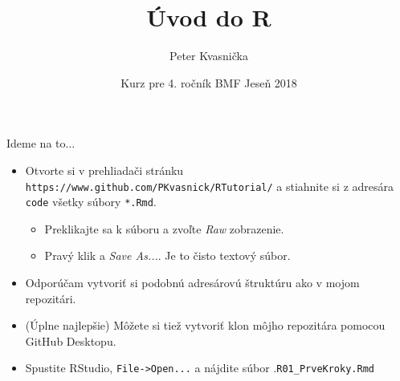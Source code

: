 \documentclass[9pt]{beamer}
\author{Peter Kvasnička}
\title{Úvod do R}
\institute{Univerzita Karlova, Praha}
\date{Kurz pre 4. ročník BMF \newline Jeseň 2018}
\begin{document}
\begin{frame}
\titlepage
\end{frame}

\clearpage  \clearpage
\clearpage  \clearpage

\begin{frame}{Ideme na to...}
	\begin{itemize}
		\item Otvorte si v prehliadači stránku \texttt{https://www.github.com/PKvasnick/RTutorial/} a stiahnite si z adresára \texttt{code} všetky súbory \texttt{*.Rmd}.
		\begin{itemize}
			\item Preklikajte sa k súboru a zvoľte \emph{Raw} zobrazenie.
			\item Pravý klik a \emph{Save As...}. Je to čisto textový súbor.
		\end{itemize}
		\item Odporúčam vytvoriť si podobnú adresárovú štruktúru ako v mojom repozitári.
		\item (Úplne najlepšie) Môžete si tiež vytvoriť klon môjho repozitára pomocou GitHub Desktopu.
		\item Spustite RStudio, \texttt{File->Open...} a nájdite súbor .\texttt{R01\_PrveKroky.Rmd}
	\end{itemize}
\end{frame}
\end{document}
